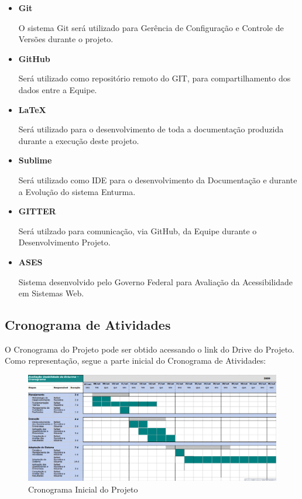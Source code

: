 	\begin{itemize}
		\item \textbf{Git}

			O sistema Git será utilizado para Gerência de Configuração e Controle de Versões durante o projeto.

		\item \textbf{GitHub}
			
			Será utilizado como repositório remoto do GIT, para compartilhamento dos dados entre a Equipe.

		\item \textbf{LaTeX}

			Será utilizado para o desenvolvimento de toda a documentação produzida durante a execução deste projeto.

		\item \textbf{Sublime}

			Será utilizado como IDE para o desenvolvimento da Documentação e durante a Evolução do sistema Enturma.

		\item \textbf{GITTER}

			Será utilzado para comunicação, via GitHub, da Equipe durante o Desenvolvimento Projeto.

		\item \textbf{ASES}

			Sistema desenvolvido pelo Governo Federal para Avaliação da Acessibilidade em Sistemas Web.

	\end{itemize}

\subsection{Cronograma de Atividades}

	O Cronograma do Projeto pode ser obtido acessando o link do Drive do Projeto. Como representação, segue a parte inicial do Cronograma de Atividades:

	\begin{figure}[H]
		\centering
		\includegraphics[width=1\textwidth]{imagens/cronograma}
		\caption{Cronograma Inicial do Projeto}
		\label{img:cronograma}
	\end{figure}

